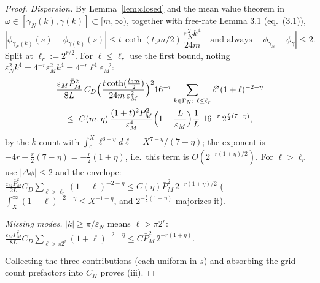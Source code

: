 \documentclass[11pt,a4paper]{article}
\theoremstyle{plain}
\theoremstyle{definition}
\newcommand{\eps}{\varepsilon}
\DeclareMathOperator{\cth}{coth}
\begin{document}
\begin{proof}
\emph{Dispersion.} By Lemma~\ref{lem:closed} and the mean value theorem in
$\omega\in[\gamma_N(k),\gamma(k)]\subset[m,\infty)$, together with free-rate
Lemma 3.1 (eq.\ (3.1)),
\[
 |\phi_{\gamma_N(k)}(s)-\phi_{\gamma(k)}(s)|
 \le t\,\cth(t_0m/2)\,\frac{\eps_N^2k^4}{24m}
 \quad\text{and always}\quad
 |\phi_{\gamma_N}-\phi_\gamma|\le2 .
\]
Split at $\ell_r:=2^{r/2}$. For $\ell\le\ell_r$ use the first bound, noting
$\eps_N^2k^4=4^{-r}\eps_M^2k^4=4^{-r}\ell^4\eps_M^{-2}$:
\begin{multline*}
 \frac{\eps_M\bar P_M^2}{8L}\,C_D
 \Bigl(\frac{t\cth(\tfrac{t_0m}2)}{24m\,\eps_M^{2}}\Bigr)^{2}16^{-r}
 \sum_{k\in\Gamma_N:\ \ell\le\ell_r}\ell^8(1+\ell)^{-2-\eta}\\
 \le\ C(m,\eta)\,\frac{(1+t)^2\bar P_M^2}{\eps_M^{4}}
 \Bigl(1+\frac L{\eps_M}\Bigr)\frac1L\ 16^{-r}\,2^{\frac r2(7-\eta)},
\end{multline*}
by the $k$-count with $\int_0^{X}\ell^{6-\eta}d\ell=X^{7-\eta}/(7-\eta)$;
the exponent is $-4r+\tfrac r2(7-\eta)=-\tfrac r2(1+\eta)$, i.e.\ this term
is $O(2^{-r(1+\eta)/2})$. For $\ell>\ell_r$ use
$|\Delta\phi|\le2$ and the envelope:
$\tfrac{\eps_M\bar P_M^2}{2L}C_D\sum_{\ell>\ell_r}(1+\ell)^{-2-\eta}
\le C(\eta)\bar P_M^2\,2^{-r(1+\eta)/2}$
($\int_X^\infty(1+\ell)^{-2-\eta}\le X^{-1-\eta}$, and
$2^{-\frac r2(1+\eta)}$ majorizes it).

\emph{Missing modes.} $|k|\ge\pi/\eps_N$ means $\ell>\pi2^r$:
$\tfrac{\eps_M\bar P_M^2}{8L}C_D\sum_{\ell>\pi2^r}(1+\ell)^{-2-\eta}
\le C\bar P_M^2\,2^{-r(1+\eta)}$.

Collecting the three contributions (each uniform in $s$) and absorbing the
grid-count prefactors into $C_H$ proves (iii).
\end{proof}
\end{document}
